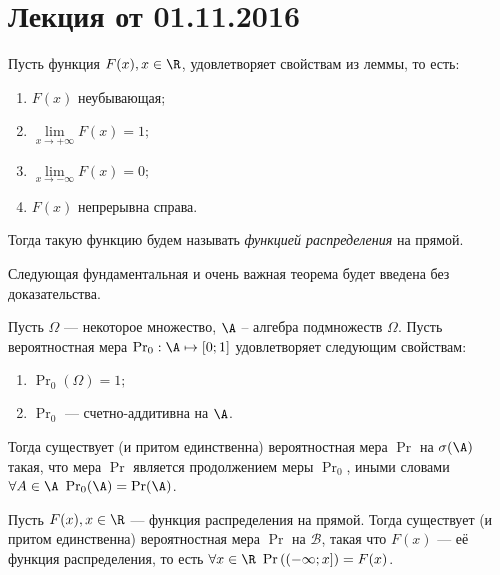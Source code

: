 \section{Лекция от 01.11.2016}

\begin{definition}
    Пусть функция $ F(x), x \in \R $, удовлетворяет свойствам из леммы, то есть: 
    \begin{enumerate}
        \item
        $F(x)$ неубывающая;
        \item
        \(\lim\limits_{x\to +\infty} F(x)= 1;\)
        \item
        \(\lim\limits_{x\to -\infty} F(x)= 0;\)
        \item
        $F(x)$ непрерывна справа.
    \end{enumerate}   
    Тогда такую функцию будем называть \emph{функцией распределения} на прямой.
\end{definition}

Следующая фундаментальная и очень важная теорема будет введена без доказательства.

\begin{theorem}
    Пусть $ \Omega $ --- некоторое множество, $ \A $ -- алгебра подмножеств $ \Omega $. Пусть вероятностная мера \(\Pr_0: \A \mapsto [0; 1] \) удовлетворяет следующим свойствам:
    \begin{enumerate}
        \item
        \( \Pr_0(\Omega) = 1;  \)
        \item 
        \( \Pr_0 \) --- счетно-аддитивна на \(\A \).
    \end{enumerate}     
    Тогда существует (и притом единственна) вероятностная мера $ \Pr $ на $ \sigma(\A) $ такая, что мера $ \Pr $ является продолжением меры $ \Pr_0 $, иными словами \(\forall A \in \A \ \Pr_0(\A) = \Pr(\A)   \).
\end{theorem}

\begin{theorem}
Пусть \(F(x), x \in \R \) --- функция распределения на прямой. Тогда существует (и притом единственна) вероятностная мера $ \Pr $ на \(\mathcal{B} \), такая что $ F(x) $ --- её функция распределения, то есть \(\forall x \in \R \ \Pr\left((-\infty; x] \right) = F(x) \).
\end{theorem}

